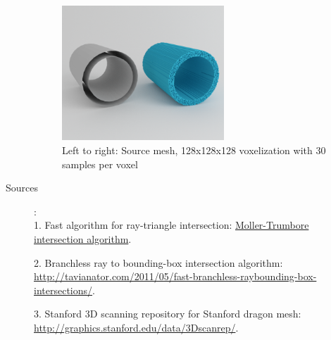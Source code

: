 \documentclass {article}
\begin{document}
\begin{description}
		
		\begin{figure}
			\begin{center}
				\includegraphics[width=0.6\textwidth]{../data/renders/tubes}
				\caption{Left to right: Source mesh, 128x128x128 voxelization with 30 samples per voxel}
			\end{center}
		\end{figure}
		
		\newpage

		\item[Sources]:\\
		
		1. Fast algorithm for ray-triangle intersection: \href{http://en.wikipedia.org/wiki/M%C3%B6ller%E2%80%93Trumbore_intersection_algorithm}{Moller-Trumbore intersection algorithm}. 
		
		2. Branchless ray to bounding-box intersection algorithm: \href{http://tavianator.com/2011/05/fast-branchless-raybounding-box-intersections/}{http://tavianator.com/2011/05/fast-branchless-raybounding-box-intersections/}.  
		
		3. Stanford 3D scanning repository for Stanford dragon mesh: \href{http://graphics.stanford.edu/data/3Dscanrep/}{http://graphics.stanford.edu/data/3Dscanrep/}. 
		
	\end{description}
	
\end{document}
